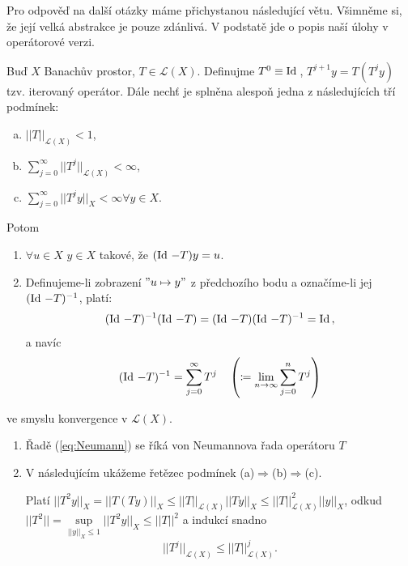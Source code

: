 Pro odpověď na další otázky máme přichystanou následující větu. Všimněme si, že její velká abstrakce je pouze zdánlivá. V podstatě jde o popis naší úlohy v operátorové verzi.


\begin{theorem}
\label{veta1}
Buď $X$ Banachův prostor, $T\in\mathscr{L}(X)$. Definujme $T^0\equiv \operatorname{Id}\,$, $T^{j+1}y=T(T^jy)$ tzv. iterovaný operátor. Dále nechť je splněna alespoň jedna z následujících tří podmínek:
\begin{enumerate}[(a)]
    \item $||T||_{\mathscr{L}(X)}<1$,
    \item $\sum\limits_{j=0}^\infty||T^j||_{\mathscr{L}(X)}<\infty$,
    \item $\sum\limits_{j=0}^\infty||T^jy||_X<\infty \forall y\in X$.
\end{enumerate}
Potom
\begin{enumerate}
    \item $\forall u \in X$  $y\in X$ takové, že $(\operatorname{Id}\,-T)y=u$.
    \item Definujeme-li zobrazení $"u\mapsto y"$ z předchozího bodu a označíme-li jej $(\operatorname{Id}\,-T)^{-1}$, platí:
    \begin{equation}
        (\operatorname{Id}\,-T)^{-1}(\operatorname{Id}\,-T) = (\operatorname{Id}\,-T)(\operatorname{Id}\,-T)^{-1}=\operatorname{Id}\,,
    \end{equation}
    a navíc
    \begin{equation}
        (\operatorname{Id}\,-T)^{-1}=\sum\limits_{j=0}^\infty T^j \quad \left(\coloneqq \underset{n\rightarrow\infty}{\lim} \sum\limits_{j=0}^{n} T^j\right)
        \label{eq:Neumann}
    \end{equation}
\end{enumerate}
ve smyslu konvergence v $\mathscr{L}(X)$.
\end{theorem} 

\Poznamka

\begin{enumerate}
    \item Řadě (\ref{eq:Neumann}) se říká von Neumannova řada operátoru $T$
    \item V následujícím ukážeme řetězec podmínek (a)$\Rightarrow$(b)$\Rightarrow$(c).
    
    Platí $||T^2y||_X = ||T(Ty)||_X\leq||T||_{\mathcal{L}(X)}||Ty||_X\leq||T||^2_{\mathscr{L}(X)}||y||_X$, odkud $||T^2||=\underset{||y||_X\leq 1}{\sup}||T^2y||_X\leq||T||^2$ a indukcí snadno
    \begin{equation}
        ||T^j||_{\mathscr{L}(X)}\leq ||T||^j_{\mathscr{L}(X)}.
    \end{equation}
\end{enumerate}

